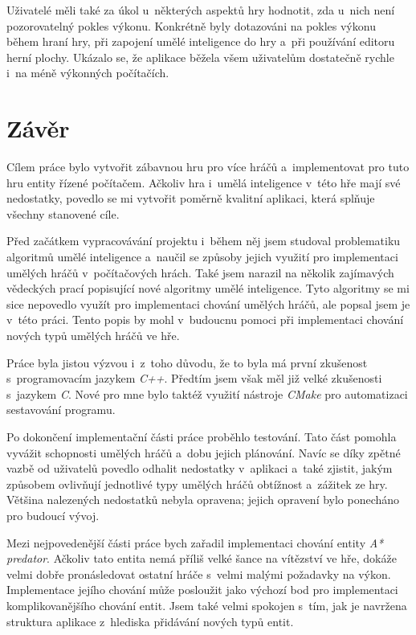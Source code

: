 Uživatelé měli také za úkol u~některých aspektů hry hodnotit, zda u~nich není pozorovatelný pokles výkonu. Konkrétně byly dotazováni na pokles výkonu během hraní hry, při zapojení umělé inteligence do hry a~při používání editoru herní plochy. Ukázalo se, že aplikace běžela všem uživatelům dostatečně rychle i~na méně výkonných počítačích.


\chapter{Závěr}

Cílem práce bylo vytvořit zábavnou hru pro více hráčů a~implementovat pro tuto hru entity řízené počítačem. Ačkoliv hra i~umělá inteligence v~této hře mají své nedostatky, povedlo se mi vytvořit poměrně kvalitní aplikaci, která splňuje všechny stanovené cíle.

Před začátkem vypracovávání projektu i~během něj jsem studoval problematiku algoritmů umělé inteligence a~naučil se způsoby jejich využití pro implementaci umělých hráčů v~počítačových hrách. Také jsem narazil na několik zajímavých vědeckých prací popisující nové algoritmy umělé inteligence. Tyto algoritmy se mi sice nepovedlo využít pro implementaci chování umělých hráčů, ale popsal jsem je v~této práci. Tento popis by mohl v~budoucnu pomoci při implementaci chování nových typů umělých hráčů ve hře.

Práce byla jistou výzvou i~z~toho důvodu, že to byla má první zkušenost s~programovacím jazykem \emph{C++}. Předtím jsem však měl již velké zkušenosti s~jazykem \emph{C}. Nové pro mne bylo taktéž využití nástroje \emph{CMake} pro automatizaci sestavování programu.

Po dokončení implementační části práce proběhlo testování. Tato část pomohla vyvážit schopnosti umělých hráčů a~dobu jejich plánování. Navíc se díky zpětné vazbě od uživatelů povedlo odhalit nedostatky v~aplikaci a~také zjistit, jakým způsobem ovlivňují jednotlivé typy umělých hráčů obtížnost a~zážitek ze hry. Většina nalezených nedostatků nebyla opravena; jejich opravení bylo ponecháno pro budoucí vývoj.

Mezi nejpovedenější části práce bych zařadil implementaci chování entity \emph{A* predator}. Ačkoliv tato entita nemá příliš velké šance na vítězství ve hře, dokáže velmi dobře pronásledovat ostatní hráče s~velmi malými požadavky na výkon. Implementace jejího chování může posloužit jako výchozí bod pro implementaci komplikovanějšího chování entit. Jsem také velmi spokojen s~tím, jak je navržena struktura aplikace z~hlediska přidávání nových typů entit.

